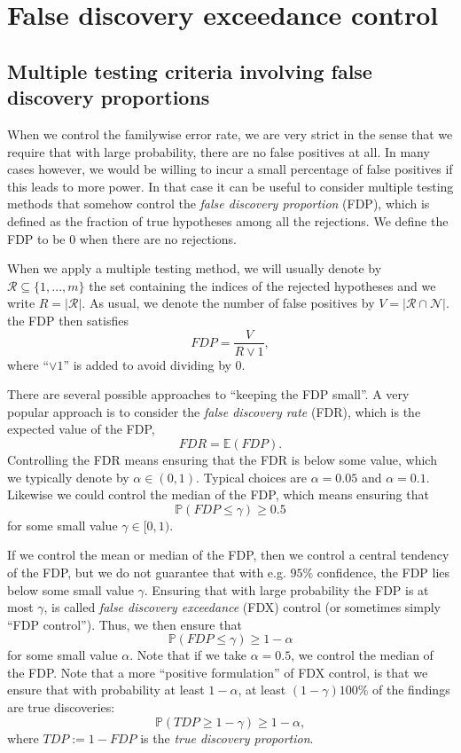 \documentclass[11pt]{article}
\theoremstyle{plain}
\theoremstyle{definition}
\newcommand{\N}{\mathcal{N}}
\newcommand{\R}{\mathcal{R}}
\newcommand{\pr}{\mathbb{P}}
\begin{document}
\newpage

\section{False discovery exceedance control} \label{secFDX}

\subsection{Multiple testing criteria involving false discovery proportions} \label{seccriteriaFDP} 
When we control the familywise error rate, we are very strict in the sense that we require that with large probability, there are no false positives at all. In many cases however, we would be willing to incur a small percentage of false positives if this leads to more power. In that case it can be useful to consider multiple testing methods that somehow control the \emph{false discovery proportion} (FDP), which is defined as the fraction of true hypotheses among all the rejections. We define the FDP  to be 0 when there are no rejections.

When we apply a multiple testing method, we will usually denote by $\R\subseteq\{1,...,m\}$ 
the set containing the indices of the rejected hypotheses and we write $R=|\R|$.
As usual, we denote the number of false positives by $V=|\R\cap \N|$.
the FDP then satisfies $$FDP=\frac{V}{R\vee 1},$$
where  ``$\vee 1$'' is added to avoid dividing by 0.

There are several possible approaches to ``keeping the FDP small''. A very popular approach is to consider the \emph{false discovery rate} (FDR), which is  the expected value of the FDP,
$$FDR=\mathbb{E}(FDP).$$
Controlling the FDR means ensuring that the FDR is below some value, which we typically denote by $\alpha\in(0,1)$. Typical choices are $\alpha=0.05$ and $\alpha=0.1$. Likewise we could control the median of the FDP, which means ensuring that 
$$\pr(FDP\leq \gamma)\geq 0.5$$
for some small value $\gamma\in[0,1)$.

If we control the mean or median of the FDP, then we control a central tendency of the FDP, but we do not guarantee that with e.g. $95\%$ confidence, the FDP lies below some small value $\gamma$. Ensuring that with large probability the FDP is at most $\gamma$, is called \emph{false discovery exceedance} (FDX) control (or sometimes simply ``FDP control''). Thus, we then ensure that
$$\pr(FDP\leq \gamma)\geq 1-\alpha$$
for some small value $\alpha$. Note that if we take $\alpha=0.5$, we control the median of the FDP.
Note that a more ``positive formulation'' of FDX control, is that we ensure that with probability at least $1-\alpha$, at least $(1-\gamma)100\%$ of the findings are true discoveries:
$$\pr(TDP\geq 1-\gamma)\geq 1-\alpha,$$
where $TDP:=1-FDP$ is the \emph{true discovery proportion}.
\end{document}
